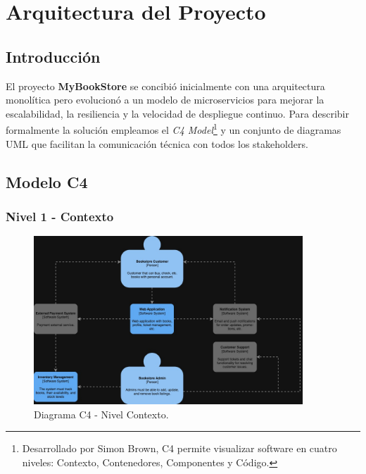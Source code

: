 \section{Arquitectura del Proyecto}

\subsection{Introducción}

El proyecto \textbf{MyBookStore} se concibió inicialmente con una arquitectura
monolítica pero evolucionó a un modelo de
microservicios para mejorar la escalabilidad, la resiliencia y la velocidad de
despliegue continuo.  
Para describir formalmente la solución empleamos
el \emph{C4 Model}\footnote{Desarrollado por Simon Brown, C4 permite
visualizar software en cuatro niveles: Contexto, Contenedores, Componentes y
Código.} y un conjunto de diagramas UML que
facilitan la comunicación técnica con todos los
stakeholders.

\subsection{Modelo C4}

\subsubsection{Nivel 1 - Contexto}

\begin{figure}[H]
  \centering
  \includegraphics[width=0.9\textwidth]{Figures/2. Architecture/Diagram-C4-Context.jpg}
  \caption{Diagrama C4 - Nivel Contexto.}
  \label{fig:c4-context}
\end{figure}

